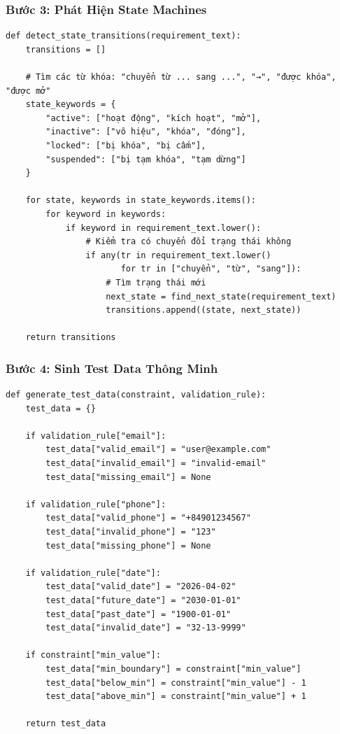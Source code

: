 \documentclass[14pt,a4paper]{article}
\begin{document}
\subsubsection{Bước 3: Phát Hiện State Machines}

\begin{lstlisting}
def detect_state_transitions(requirement_text):
    transitions = []
    
    # Tìm các từ khóa: "chuyển từ ... sang ...", "→", "được khóa", "được mở"
    state_keywords = {
        "active": ["hoạt động", "kích hoạt", "mở"],
        "inactive": ["vô hiệu", "khóa", "đóng"],
        "locked": ["bị khóa", "bị cấm"],
        "suspended": ["bị tạm khóa", "tạm dừng"]
    }
    
    for state, keywords in state_keywords.items():
        for keyword in keywords:
            if keyword in requirement_text.lower():
                # Kiểm tra có chuyển đổi trạng thái không
                if any(tr in requirement_text.lower() 
                       for tr in ["chuyển", "từ", "sang"]):
                    # Tìm trạng thái mới
                    next_state = find_next_state(requirement_text)
                    transitions.append((state, next_state))
    
    return transitions
\end{lstlisting}

\subsubsection{Bước 4: Sinh Test Data Thông Minh}

\begin{lstlisting}
def generate_test_data(constraint, validation_rule):
    test_data = {}
    
    if validation_rule["email"]:
        test_data["valid_email"] = "user@example.com"
        test_data["invalid_email"] = "invalid-email"
        test_data["missing_email"] = None
    
    if validation_rule["phone"]:
        test_data["valid_phone"] = "+84901234567"
        test_data["invalid_phone"] = "123"
        test_data["missing_phone"] = None
    
    if validation_rule["date"]:
        test_data["valid_date"] = "2026-04-02"
        test_data["future_date"] = "2030-01-01"
        test_data["past_date"] = "1900-01-01"
        test_data["invalid_date"] = "32-13-9999"
    
    if constraint["min_value"]:
        test_data["min_boundary"] = constraint["min_value"]
        test_data["below_min"] = constraint["min_value"] - 1
        test_data["above_min"] = constraint["min_value"] + 1
    
    return test_data
\end{lstlisting}
\end{document}
